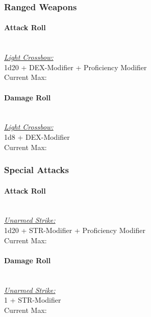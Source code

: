 {\subsubsection*{Ranged Weapons}
\paragraph*{Attack Roll}\hfill\\
\underline{\textit{Light Crossbow:}}\\
1d20 + DEX-Modifier + Proficiency Modifier\\
\indent Current Max: 
\paragraph*{Damage Roll}\hfill\\
\underline{\textit{Light Crossbow:}}\\
1d8 + DEX-Modifier\\
\indent Current Max: 
\subsubsection*{Special Attacks}
\paragraph*{Attack Roll}\hfill\\
\underline{\textit{Unarmed Strike:}}\\
1d20 + STR-Modifier + Proficiency Modifier\\
\indent Current Max: 
\paragraph*{Damage Roll}\hfill\\
\underline{\textit{Unarmed Strike:}}\\
1 + STR-Modifier\\
\indent Current Max: 
}